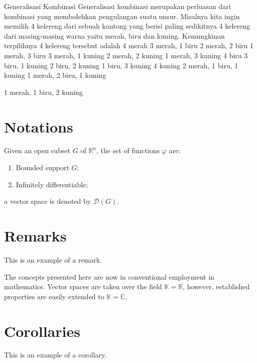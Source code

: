 \documentclass[11pt,fleqn]{book} %
\begin{document}
Generalisasi Kombinasi Generalisasi kombinasi merupakan perluasan dari kombinasi yang membolehkan pengulangan suatu unsur. Misalnya kita ingin memilih 4 kelereng dari sebuah kantong yang berisi paling sedikitnya 4 kelereng dari masing-masing warna yaitu merah, biru dan kuning. Kemungkinan terpilihnya 4 kelereng tersebut adalah
{4 merah} 				{3 merah, 1 biru} 
{2 merah, 2 biru}	 	{1 merah, 3 biru} 
{3 merah, 1 kuning} 	{2 merah, 2 kuning} 
{1 merah, 3 kuning}	 {4 biru} {3 biru, 1 kuning}
 {2 biru, 2 kuning} {1 biru, 3 kuning} {4 kuning} {2 merah, 1 biru, 1 kuning} {1 merah, 2 biru, 1 kuning} {1 merah, 1 biru, 2 kuning

\section{Notations}

\begin{notation}
Given an open subset $G$ of $\mathbb{R}^n$, the set of functions $\varphi$ are:
\begin{enumerate}
\item Bounded support $G$;
\item Infinitely differentiable;
\end{enumerate}
a vector space is denoted by $\mathcal{D}(G)$. 
\end{notation}


\section{Remarks}

This is an example of a remark.

\begin{remark}
The concepts presented here are now in conventional employment in mathematics. Vector spaces are taken over the field $\mathbb{K}=\mathbb{R}$, however, established properties are easily extended to $\mathbb{K}=\mathbb{C}$.
\end{remark}


\section{Corollaries}

This is an example of a corollary.

}
\end{document}
